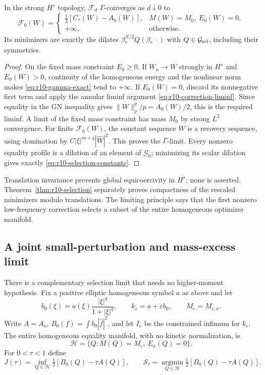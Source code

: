 \begin{proposition}
\label{prop:r10-gamma}
In the strong $H^s$ topology, $\mathcal F_d$ $\Gamma$-converges as
$d\downarrow0$ to
\[
 \mathcal F_0(W)=
 \begin{cases}
 \tfrac12[C_*(W)-A_0(W)],&M(W)=M_0,\ E_0(W)=0,\\
 +\infty,&\text{otherwise}.
 \end{cases}
\]
Its minimizers are exactly the dilates
$\beta_*^{N/2}Q(\beta_*\,\cdot)$ with
$Q\in\mathcal G_{\rm sel}$, including their symmetries.
\end{proposition}

\begin{proof}
On the fixed mass constraint $E_0\ge0$. If $W_n\to W$ strongly in
$H^s$ and $E_0(W)>0$, continuity of the homogeneous energy and the
nonlinear norm makes \eqref{eq:r10-gamma-exact} tend to $+\infty$.
If $E_0(W)=0$, discard its nonnegative first term and apply the annular
liminf argument \eqref{eq:r10-correction-liminf}. Since equality in
the GN inequality gives $\|W\|_p^p/p=A_0(W)/2$, this is the required
liminf. A limit of the fixed mass constraint has mass $M_0$ by strong
$L^2$ convergence. For finite $\mathcal F_0(W)$, the constant sequence
$W$ is a recovery sequence, using domination by
$C|\xi|^{m+q}|\widehat W|^2$. This proves the $\Gamma$-limit.
Every nonzero equality profile is a dilation of an element of
$\mathcal G_0$; minimizing its scalar dilation gives exactly
\eqref{eq:r10-selection-constants}.
\end{proof}

Translation invariance prevents global equicoercivity in $H^s$; none
is asserted. Theorem~\ref{thm:r10-selection} separately proves
compactness of the rescaled minimizers modulo translations. The
limiting principle says that the first nonzero low-frequency correction
selects a subset of the entire homogeneous optimizer manifold.

\subsection{A joint small-perturbation and mass-excess limit}

There is a complementary selection limit that needs no higher-moment
hypothesis. Fix a positive elliptic homogeneous symbol $a$ as above and
let
\[
 b_0(\xi)=a(\xi)\frac{|\xi|^q}{1+|\xi|^q},\qquad
 k_\varepsilon=a+\varepsilon b_0,\qquad M_c=M_{c,a}.
\]
Write $A=A_a$, $B_0(f)=\int b_0|\widehat f|^2$, and let
$I_\varepsilon$ be the constrained infimum for $k_\varepsilon$. The
entire homogeneous equality manifold, with no kinetic normalization, is
\[
 \mathcal H=\{Q:M(Q)=M_c,\ E_a(Q)=0\}.
\]
For $0<\tau<1$ define
\[
 J(\tau)=\inf_{Q\in\mathcal H}\tfrac12[B_0(Q)-\tau A(Q)],\qquad
 \mathcal S_\tau=\operatorname*{argmin}_{Q\in\mathcal H}
                                \tfrac12[B_0(Q)-\tau A(Q)].
\]

